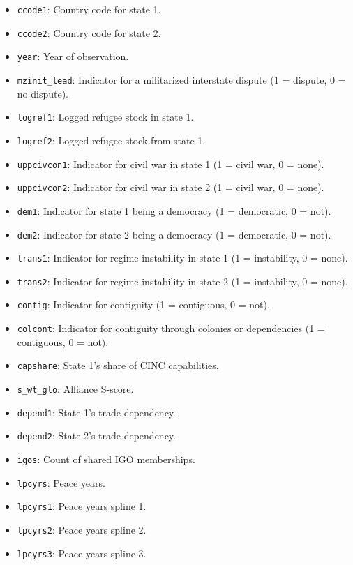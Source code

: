 \documentclass[12pt]{article}
\begin{document}
\begin{itemize}
  \item \texttt{ccode1}: Country code for state 1.
  \item \texttt{ccode2}: Country code for state 2.
  \item \texttt{year}: Year of observation.
  \item \texttt{mzinit\_lead}: Indicator for a militarized interstate dispute (1 = dispute, 0 = no dispute).
  \item \texttt{logref1}: Logged refugee stock in state 1.
  \item \texttt{logref2}: Logged refugee stock from state 1.
  \item \texttt{uppcivcon1}: Indicator for civil war in state 1 (1 = civil war, 0 = none).
  \item \texttt{uppcivcon2}: Indicator for civil war in state 2 (1 = civil war, 0 = none).
  \item \texttt{dem1}: Indicator for state 1 being a democracy (1 = democratic, 0 = not).
  \item \texttt{dem2}: Indicator for state 2 being a democracy (1 = democratic, 0 = not).
  \item \texttt{trans1}: Indicator for regime instability in state 1 (1 = instability, 0 = none).
  \item \texttt{trans2}:  Indicator for regime instability in state 2 (1 = instability, 0 = none).
  \item \texttt{contig}: Indicator for contiguity (1 = contiguous, 0 = not).
  \item \texttt{colcont}: Indicator for contiguity through colonies or dependencies (1 = contiguous, 0 = not).
  \item \texttt{capshare}: State 1's share of CINC capabilities.
  \item \texttt{s\_wt\_glo}: Alliance S-score.
  \item \texttt{depend1}: State 1's trade dependency.
  \item \texttt{depend2}: State 2's trade dependency.
  \item \texttt{igos}: Count of shared IGO memberships.
  \item \texttt{lpcyrs}: Peace years.
  \item \texttt{lpcyrs1}: Peace years spline 1.
  \item \texttt{lpcyrs2}: Peace years spline 2.
  \item \texttt{lpcyrs3}: Peace years spline 3.
\end{itemize}
\end{document}
